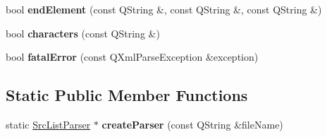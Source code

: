 \begin{DoxyCompactItemize}
\item 
\hypertarget{classSrcListParser_a629e0993dbd5ac741cb92a21a6418bb7}{
bool {\bfseries endElement} (const QString \&, const QString \&, const QString \&)}
\label{classSrcListParser_a629e0993dbd5ac741cb92a21a6418bb7}

\item 
\hypertarget{classSrcListParser_a03a62b1e3c241d93a872e86cd511abbd}{
bool {\bfseries characters} (const QString \&)}
\label{classSrcListParser_a03a62b1e3c241d93a872e86cd511abbd}

\item 
\hypertarget{classSrcListParser_af51fc4aaa1bccbfa857bec005753d0a0}{
bool {\bfseries fatalError} (const QXmlParseException \&exception)}
\label{classSrcListParser_af51fc4aaa1bccbfa857bec005753d0a0}

\end{DoxyCompactItemize}
\subsection*{Static Public Member Functions}
\begin{DoxyCompactItemize}
\item 
\hypertarget{classSrcListParser_aeee93e1a2bd6d1bd1ba398873a18ed8f}{
static \hyperlink{classSrcListParser}{SrcListParser} $\ast$ {\bfseries createParser} (const QString \&fileName)}
\label{classSrcListParser_aeee93e1a2bd6d1bd1ba398873a18ed8f}

\end{DoxyCompactItemize}
